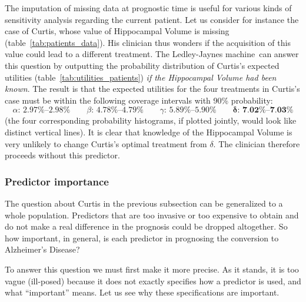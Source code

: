 \documentclass[utf8]{FrontiersinHarvard} %
\renewcommand*{\|}[1][]{\nonscript\:#1\vert\nonscript\:\mathopen{}}
\newcommand*{\ad}{Alzheimer's Disease}
\newcommand*{\ljm}{Ledley-Jaynes machine}
\begin{document}
The imputation of missing data at prognostic time is useful for various kinds of sensitivity analysis regarding the current patient. Let us consider for instance the case of Curtis, whose value of Hippocampal Volume is missing (table~\ref{tab:patients_data}). His clinician thus wonders if the acquisition of this value could lead to a different treatment. The \ljm\ can answer this question by outputting the probability distribution of Curtis's expected utilities (table~\ref{tab:utilities_patients}) \emph{if the Hippocampal Volume had been known}. The result is that the expected utilities for the four treatments in Curtis's case must be within the following coverage intervals with 90\% probability:
\begin{equation}
  \label{eq:possible_utilities_curtis}
  \alpha\text{: 2.97\%--2.98\%}\qquad
  \beta\text{: 4.78\%--4.79\%}\qquad
  \gamma\text{: 5.89\%--5.90\%}\qquad
  \bm{\delta}\textbf{: 7.02\%--7.03\%}
\end{equation}
(the four corresponding probability histograms, if plotted jointly, would look like distinct vertical lines). It is clear that knowledge of the Hippocampal Volume is very unlikely to change Curtis's optimal treatment from $\delta$. The clinician therefore proceeds without this predictor.

\subsubsection{Predictor importance}
\label{sec:predictor_importance}


The question about Curtis in the previous subsection can be generalized to a whole population. Predictors that are too invasive or too expensive to obtain and do not make a real difference in the prognosis could be dropped altogether. So how important, in general, is each predictor in prognosing the conversion to \ad?

To answer this question we must first make it more precise. As it stands, it is too vague (ill-posed) because it does not exactly specifies how a predictor is used, and what \enquote{important} means. Let us see why these specifications are important.

\pagebreak
\end{document}
